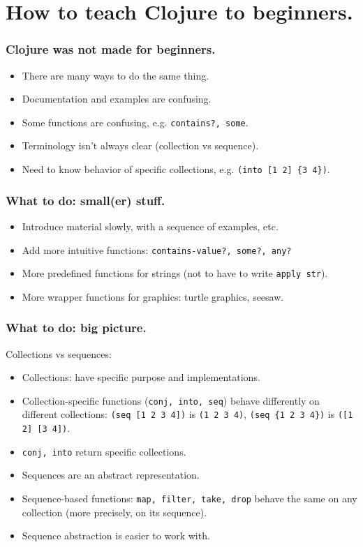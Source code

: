 \documentclass{beamer}
\begin{document}
\section{How to teach Clojure to beginners.}

\begin{frame}
  \frametitle{Clojure was not made for beginners.}
\begin{itemize}
\item There are many ways to do the same thing.
\item Documentation and examples are confusing.
\item Some functions are confusing, e.g. {\tt contains?, some}.
\item Terminology isn't always clear (collection vs sequence).
\item Need to know behavior of specific collections, e.g. {\tt (into [1 2] \{3 4\})}.
\end{itemize}
\end{frame}

\begin{frame}
  \frametitle{What to do: small(er) stuff.}
\begin{itemize}
\item Introduce material slowly, with a sequence of examples, etc.
\item Add more intuitive functions: {\tt contains-value?, some?, any?}
\item More predefined functions for strings (not to have to write {\tt apply str}).
\item More wrapper functions for graphics: turtle graphics, seesaw. 
\end{itemize}
\end{frame}

\begin{frame}
  \frametitle{What to do: big picture.}
Collections vs sequences:
\begin{itemize}
\item Collections: have specific purpose and implementations. 
\item Collection-specific functions ({\tt conj, into, seq}) behave differently on different collections:
{\tt (seq [1 2 3 4])} is {\tt (1 2 3 4)}, {\tt (seq \{1 2 3 4\})} is {\tt ([1 2] [3 4])}. 
\item {\tt conj, into} return specific collections. 
\item Sequences are an abstract representation. 
\item Sequence-based functions: {\tt map, filter, take, drop} behave the same on any collection (more precisely, on its sequence). 
\item Sequence abstraction is easier to work with. 
\end{itemize}
\end{frame}
\end{document}
